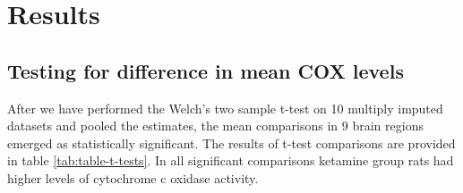 \documentclass[man]{apa6}
\begin{document}
\hypertarget{results}{%
\section{Results}\label{results}}

\hypertarget{testing-for-difference-in-mean-cox-levels-1}{%
\subsection{Testing for difference in mean COX levels}\label{testing-for-difference-in-mean-cox-levels-1}}

\begin{table}[t]

\caption{\label{tab:table-t-tests}Brain regions with increased COX levels ($\mu$mol/min/gram tissue) after subchronic ketamine treatment}
\centering
{}
\end{table}

After we have performed the Welch's two sample t-test on 10 multiply imputed datasets and pooled the estimates, the mean comparisons in 9 brain regions emerged as statistically significant. The results of t-test comparisons are provided in table \ref{tab:table-t-tests}. In all significant comparisons ketamine group rats had higher levels of cytochrome c oxidase activity.
\end{document}
